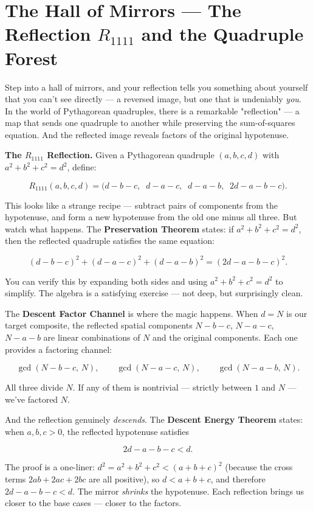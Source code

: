 \documentclass[11pt,openright,twoside]{book}
\theoremstyle{definition}
\begin{document}
\bigskip


\section{The Hall of Mirrors — The Reflection $R_{1111}$ and the Quadruple Forest}

Step into a hall of mirrors, and your reflection tells you something about yourself that you can't see directly --- a reversed image, but one that is undeniably \textit{you}. In the world of Pythagorean quadruples, there is a remarkable "reflection" --- a map that sends one quadruple to another while preserving the sum-of-squares equation. And the reflected image reveals factors of the original hypotenuse.

\textbf{The $R_{1111}$ Reflection.} Given a Pythagorean quadruple $(a, b, c, d)$ with $a^2 + b^2 + c^2 = d^2$, define:

\[R_{1111}(a, b, c, d) = \big(d - b - c,\;\; d - a - c,\;\; d - a - b,\;\; 2d - a - b - c\big).\]

This looks like a strange recipe --- subtract pairs of components from the hypotenuse, and form a new hypotenuse from the old one minus all three. But watch what happens. The \textbf{Preservation Theorem} states: if $a^2 + b^2 + c^2 = d^2$, then the reflected quadruple satisfies the same equation:

\[(d - b - c)^2 + (d - a - c)^2 + (d - a - b)^2 = (2d - a - b - c)^2.\]

You can verify this by expanding both sides and using $a^2 + b^2 + c^2 = d^2$ to simplify. The algebra is a satisfying exercise --- not deep, but surprisingly clean.

The \textbf{Descent Factor Channel} is where the magic happens. When $d = N$ is our target composite, the reflected spatial components $N - b - c$, $N - a - c$, $N - a - b$ are linear combinations of $N$ and the original components. Each one provides a factoring channel:

\[\gcd(N - b - c, \, N), \qquad \gcd(N - a - c, \, N), \qquad \gcd(N - a - b, \, N).\]

All three divide $N$. If any of them is nontrivial --- strictly between $1$ and $N$ --- we've factored $N$.

And the reflection genuinely \textit{descends}. The \textbf{Descent Energy Theorem} states: when $a, b, c > 0$, the reflected hypotenuse satisfies

\[2d - a - b - c < d.\]

The proof is a one-liner: $d^2 = a^2 + b^2 + c^2 < (a + b + c)^2$ (because the cross terms $2ab + 2ac + 2bc$ are all positive), so $d < a + b + c$, and therefore $2d - a - b - c < d$. The mirror \textit{shrinks} the hypotenuse. Each reflection brings us closer to the base cases --- closer to the factors.
\end{document}
